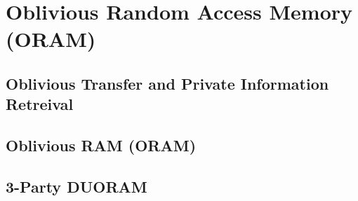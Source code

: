 \chapter{Oblivious Random Access Memory (ORAM)}
\label{ch:ORAM}

\section{Oblivious Transfer and Private Information Retreival}


\section{Oblivious RAM (ORAM)}


\section{3-Party DUORAM}


